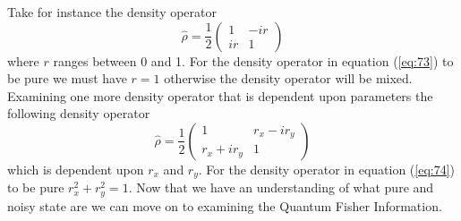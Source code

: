 \documentclass[twocolumn]{article}
\begin{document}
Take for instance the density operator
\begin{equation} \label{eq:73}
\hat{\rho}=\frac{1}{2}
\begin{pmatrix}
1 & -ir \\
ir & 1
\end{pmatrix}
\end{equation}
where $r$ ranges between 0 and 1. For the density operator in equation (\ref{eq:73}) to be pure we must have $r=1$ otherwise the density operator will be mixed. Examining one more density operator that is dependent upon parameters the following density operator 
\begin{equation} \label{eq:74}
\hat{\rho}=\frac{1}{2}
\begin{pmatrix}
1 & r_x-ir_y \\
r_x+ir_y & 1
\end{pmatrix}
\end{equation}
which is dependent upon $r_x$ and $r_y$. For the density operator in equation (\ref{eq:74}) to be pure $r_x^2+r_y^2=1$. Now that we have an understanding of what pure and noisy state are we can move on to examining the Quantum Fisher Information.
\end{document}
